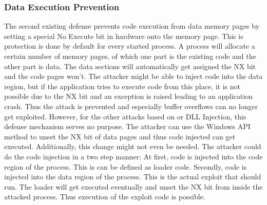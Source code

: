 \subsubsection{Data Execution Prevention}
The second existing defense prevents code execution from data memory pages by setting a special No Execute bit in hardware onto the memory page. This is protection is done by default for every started process. A process will allocate a certain number of memory pages, of which one part is the existing code and the other part is data. The data sections will automatically get assigned the NX bit and the code pages won't. The attacker might be able to inject code into the data region, but if the application tries to execute code from this place, it is not possible due to the NX bit and an exception is raised leading to an application crash. Thus the attack is prevented and especially buffer overflows can no longer get exploited. However, for the other attacks based on  or DLL Injection, this defense mechanism serves no purpose. The attacker can use the Windows API method  to unset the NX bit of data pages and thus code injected can get executed. Additionally, this change might not even be needed. The attacker could do the code injection in a two step manner: At first, code is injected into the code region of the process. This is can be defined as loader code. Secondly, code is injected into the data region of the process. This is the actual exploit that should run. The loader will get executed eventually and unset the NX bit from inside the attacked process. Thus execution of the exploit code is possible.